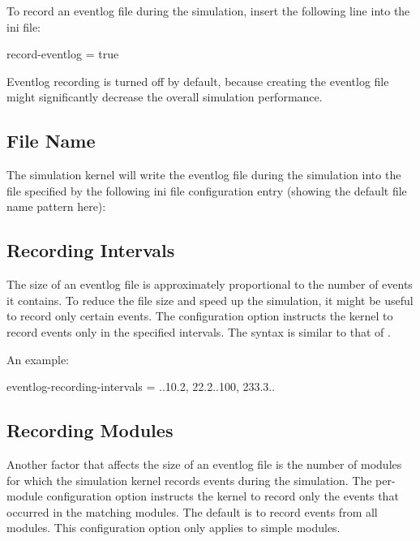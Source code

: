 To record an eventlog file during the simulation, insert the following line into
the ini file:

\begin{inifile}
record-eventlog = true
\end{inifile}

\begin{note}
    Eventlog recording is turned off by default, because creating the eventlog file
    might significantly decrease the overall simulation performance.
\end{note}

\subsection{File Name}

The simulation kernel will write the eventlog file during the simulation into the file
specified by the following ini file configuration entry (showing the default file name
pattern here):


\subsection{Recording Intervals}

The size of an eventlog file is approximately proportional to the number of
events it contains. To reduce the file size and speed up the simulation, it
might be useful to record only certain events. The
 configuration option instructs the
kernel to record events only in the specified intervals. The syntax is
similar to that of .

An example:

\begin{inifile}
eventlog-recording-intervals = ..10.2, 22.2..100, 233.3..
\end{inifile}

\subsection{Recording Modules}

Another factor that affects the size of an eventlog file is the number of
modules for which the simulation kernel records events during the
simulation. The  per-module configuration
option instructs the kernel to record only the events that occurred in the
matching modules. The default is to record events from all modules. This
configuration option only applies to simple modules.

